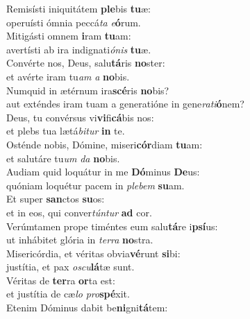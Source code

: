 \evenverse Remisísti iniquitátem \textbf{ple}bis \textbf{tu}æ:~\*\\
\evenverse operuísti ómnia peccá\textit{ta} \textit{e}\textbf{ó}rum.\\
\oddverse Mitigásti omnem \textbf{i}ram \textbf{tu}am:~\*\\
\oddverse avertísti ab ira indignati\textit{ó}\textit{nis} \textbf{tu}æ.\\
\evenverse Convérte nos, Deus, salu\textbf{tá}ris \textbf{no}ster:~\*\\
\evenverse et avérte iram tu\textit{am} \textit{a} \textbf{no}bis.\\
\oddverse Numquid in ætérnum ira\textbf{scé}ris \textbf{no}bis?~\*\\
\oddverse aut exténdes iram tuam a generatióne in gene\textit{ra}\textit{ti}\textbf{ó}nem?\\
\evenverse Deus, tu convérsus vi\textbf{vi}fi\textbf{cá}bis nos:~\*\\
\evenverse et plebs tua lætá\textit{bi}\textit{tur} \textbf{in} te.\\
\oddverse Osténde nobis, Dómine, miseri\textbf{cór}diam \textbf{tu}am:~\*\\
\oddverse et salutáre tu\textit{um} \textit{da} \textbf{no}bis.\\
\evenverse Audiam quid loquátur in me \textbf{Dó}minus \textbf{De}us:~\*\\
\evenverse quóniam loquétur pacem in \textit{ple}\textit{bem} \textbf{su}am.\\
\oddverse Et super \textbf{san}ctos \textbf{su}os:~\*\\
\oddverse et in eos, qui conver\textit{tún}\textit{tur} \textbf{ad} cor.\\
\evenverse Verúmtamen prope timéntes eum salu\textbf{tá}re i\textbf{psí}us:~\*\\
\evenverse ut inhábitet glória in \textit{ter}\textit{ra} \textbf{no}stra.\\
\oddverse Misericórdia, et véritas obvia\textbf{vé}runt \textbf{si}bi:~\*\\
\oddverse justítia, et pax \textit{o}\textit{scu}\textbf{lá}tæ sunt.\\
\evenverse Véritas de \textbf{ter}ra \textbf{or}ta est:~\*\\
\evenverse et justítia de cæ\textit{lo} \textit{pro}\textbf{spé}xit.\\
\oddverse Etenim Dóminus dabit be\textbf{ni}gni\textbf{tá}tem:~\*\\
